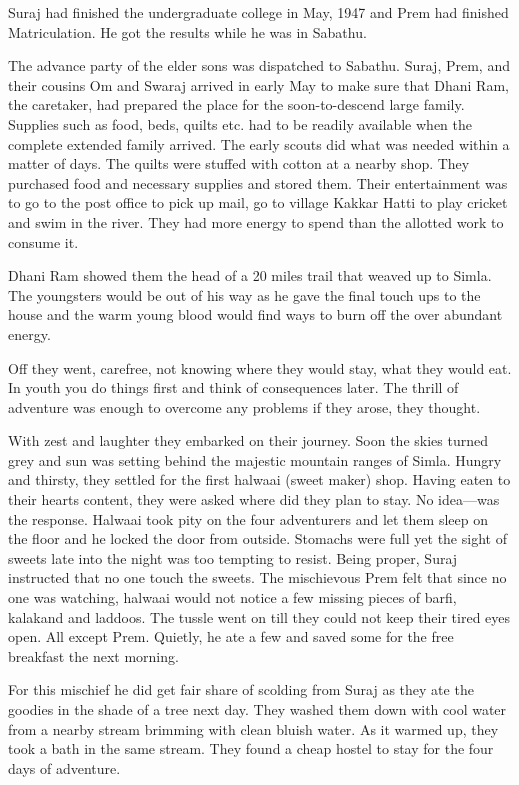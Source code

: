 Suraj had finished the undergraduate college in May, 1947 and Prem had finished Matriculation. He got the results while he was in Sabathu. 

The advance party of the elder sons was dispatched to Sabathu. Suraj, Prem, and their cousins Om and Swaraj arrived in early May to make sure that Dhani Ram, the caretaker, had prepared the place for the soon-to-descend large family. Supplies such as food, beds, quilts etc. had to be readily available when the complete extended family arrived. The early scouts did what was needed within a matter of days. The quilts were stuffed with cotton at a nearby shop. They purchased food and necessary supplies and stored them. Their entertainment was to go to the post office to pick up mail, go to village Kakkar Hatti to play cricket and swim in the river. They had more energy to spend than the allotted work to consume it. 

Dhani Ram showed them the head of a 20 miles trail that weaved up to Simla. The youngsters would be out of his way as he gave the final touch ups to the house and the warm young blood would find ways to burn off the over abundant energy. 

Off they went, carefree, not knowing where they would stay, what they would eat. In youth you do things first and think of consequences later. The thrill of adventure was enough to overcome any problems if they arose, they thought.

With zest and laughter they embarked on their journey. Soon the skies turned grey and sun was setting behind the majestic  mountain ranges of Simla. Hungry and thirsty, they settled for the first halwaai (sweet maker) shop. Having eaten to their hearts content, they were asked where did they plan to stay. No idea—was the response. Halwaai took pity on the four adventurers and let them sleep on the floor and he locked the door from outside. Stomachs were full yet the sight of sweets late into the night was too tempting to resist. Being proper, Suraj instructed that no one touch the sweets. The mischievous Prem felt that since no one was watching, halwaai would not notice a few missing pieces of barfi, kalakand and laddoos. The tussle went on till they could not keep their tired eyes open. All except Prem. Quietly, he ate a few and saved some for the free breakfast the next morning. 

For this mischief he did get fair share of scolding from Suraj as they ate the goodies in the shade of a tree next day. They washed them down with cool water from a nearby stream brimming with clean bluish water. As it warmed up, they took a bath in the same stream.  They found a cheap hostel to stay for the four days of adventure. 

